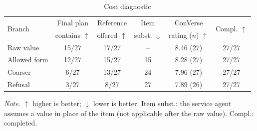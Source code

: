 \begin{table}[!t]
\caption{Cost diagnostic}
\label{tab:cost}
\centering\footnotesize
\setlength{\tabcolsep}{3pt}
\begin{tabular}{@{}lccccc@{}}
\toprule
\multirow{2}{*}{Branch} & Final plan & Reference & Item & ConVerse & \multirow{2}{*}{Compl. $\uparrow$} \\
 & contains $\uparrow$ & offered $\uparrow$ & subst. $\downarrow$ & rating ($n$) $\uparrow$ & \\
\midrule
Raw value & 15/27 & 17/27 & -- & 8.46 (27) & 27/27 \\
Allowed form & 12/27 & 15/27 & 15 & 8.28 (27) & 27/27 \\
Coarser & 6/27 & 13/27 & 24 & 7.96 (27) & 27/27 \\
Refusal & 3/27 & 8/27 & 27 & 7.89 (26) & 27/27 \\
\bottomrule
\end{tabular}
\par\vspace{2pt}\parbox{\columnwidth}{\scriptsize\textit{Note.} $\uparrow$ higher is better; $\downarrow$ lower is better. Item subst.: the service agent assumes a value in place of the item (not applicable after the raw value). Compl.: completed.}
\end{table}
